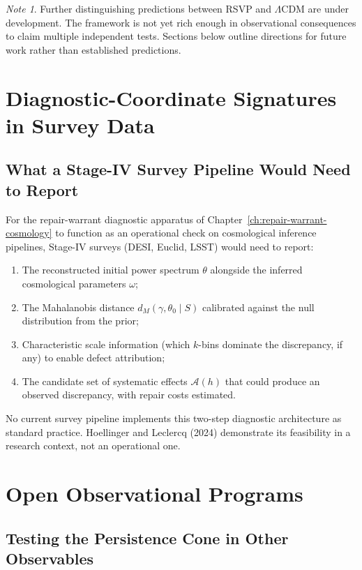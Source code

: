 \documentclass[12pt,a4paper,twoside,openright]{book}
\theoremstyle{plain}
\theoremstyle{definition}
\theoremstyle{remark}
\newtheorem{note}[theorem]{Note}
\begin{document}
\begin{note}
Further distinguishing predictions between RSVP and $\Lambda$CDM are under development. The framework is not yet rich enough in observational consequences to claim multiple independent tests. Sections below outline directions for future work rather than established predictions.
\end{note}

\section{Diagnostic-Coordinate Signatures in Survey Data}

\subsection{What a Stage-IV Survey Pipeline Would Need to Report}

For the repair-warrant diagnostic apparatus of Chapter~\ref{ch:repair-warrant-cosmology} to function as an operational check on cosmological inference pipelines, Stage-IV surveys (DESI, Euclid, LSST) would need to report:

\begin{enumerate}
\item The reconstructed initial power spectrum $\theta$ alongside the inferred cosmological parameters $\omega$;
\item The Mahalanobis distance $d_M(\gamma, \theta_0 \mid S)$ calibrated against the null distribution from the prior;
\item Characteristic scale information (which $k$-bins dominate the discrepancy, if any) to enable defect attribution;
\item The candidate set of systematic effects $\mathcal{A}(h)$ that could produce an observed discrepancy, with repair costs estimated.
\end{enumerate}

No current survey pipeline implements this two-step diagnostic architecture as standard practice. Hoellinger and Leclercq (2024) demonstrate its feasibility in a research context, not an operational one.

\section{Open Observational Programs}

\subsection{Testing the Persistence Cone in Other Observables}
\end{document}
